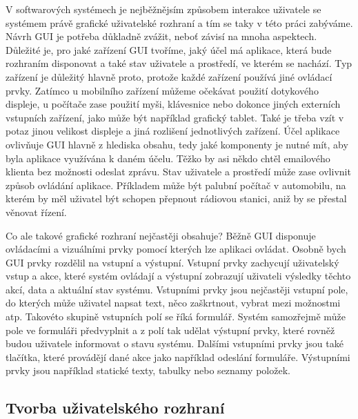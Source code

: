 V softwarových systémech je nejběžnějsím způsobem interakce uživatele se systémem právě grafické uživatelské rozhraní a tím se taky v této práci zabýváme. Návrh GUI je potřeba důkladně zvážit, neboť závisí na mnoha aspektech. Důležité je, pro jaké zařízení GUI tvoříme, jaký účel má aplikace, která bude rozhraním disponovat a také stav uživatele a prostředí, ve kterém se nachází. Typ zařízení je důležitý hlavně proto, protože každé zařízení používá jiné ovládací prvky. Zatímco u mobilního zařízení můžeme očekávat použití dotykového displeje, u počítače zase použití myši, klávesnice nebo dokonce jiných externích vstupních zařízení, jako může být například grafický tablet. Také je třeba vzít v potaz jinou velikost displeje a jiná rozlišení jednotlivých zařízení. Účel aplikace ovlivňuje GUI hlavně z hlediska obsahu, tedy jaké komponenty je nutné mít, aby byla aplikace využívána k daném účelu. Těžko by asi někdo chtěl emailového klienta bez možnosti odeslat zprávu. Stav uživatele a prostředí může zase ovlivnit způsob ovládání aplikace. Příkladem může být palubní počítač v automobilu, na kterém by měl uživatel být schopen přepnout rádiovou stanici, aniž by se přestal věnovat řízení. 

Co ale takové grafické rozhraní nejčastěji obsahuje? Běžně GUI disponuje ovládacími a vizuálními prvky pomocí kterých lze aplikaci ovládat. Osobně bych GUI prvky rozdělil na vstupní a výstupní. Vstupní prvky zachycují uživatelský vstup a akce, které systém ovládají a výstupní zobrazují uživateli výsledky těchto akcí, data a aktuální stav systému. Vstupními prvky jsou nejčastěji vstupní pole, do kterých může uživatel napsat text, něco zaškrtnout, vybrat mezi možnostmi atp. Takovéto skupině vstupních polí se říká formulář. Systém samozřejmě může pole ve formuláři předvyplnit a z polí tak udělat výstupní prvky, které rovněž budou uživatele informovat o stavu systému. Dalšími vstupními prvky jsou také tlačítka, které provádějí dané akce jako například odeslání formuláře. Výstupními prvky jsou například statické texty, tabulky nebo seznamy položek. 

\subsection{Tvorba uživatelského rozhraní}

